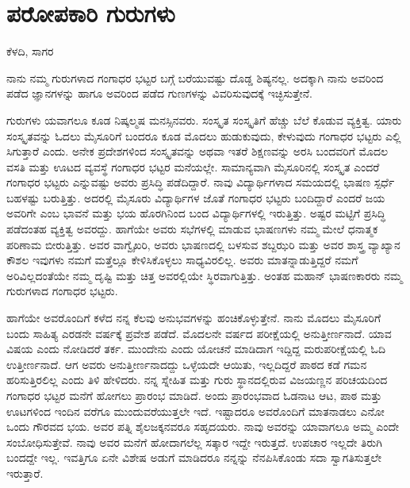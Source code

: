 {\fontsize{14}{16}\selectfont
\chapter{ಪರೋಪಕಾರಿ ಗುರುಗಳು}

\begin{center}
\smallskip
ಕೆಳದಿ, ಸಾಗರ \\
\addrule
\end{center}
ನಾನು ನಮ್ಮ ಗುರುಗಳಾದ ಗಂಗಾಧರ ಭಟ್ಟರ ಬಗ್ಗೆ ಬರೆಯುವಷ್ಟು ದೊಡ್ಡ ಶಿಷ್ಯನಲ್ಲ. ಅದಕ್ಕಾಗಿ ನಾನು ಅವರಿಂದ ಪಡೆದ ಜ್ಞಾನಗಳನ್ನು ಹಾಗೂ ಅವರಿಂದ ಪಡೆದ ಗುಣಗಳನ್ನು ವಿವರಿಸುವುದಕ್ಕೆ ಇಚ್ಛಿಸುತ್ತೇನೆ.

ಗುರುಗಳು ಯವಾಗಲೂ ಕೂಡ ನಿಷ್ಕಲ್ಮಷ ಮನಸ್ಸಿನವರು. ಸಂಸ್ಕೃತ ಸಂಸ್ಕೃತಿಗೆ ಹೆಚ್ಚು ಬೆಲೆ ಕೊಡುವ ವ್ಯಕ್ತಿತ್ವ. ಯಾರು ಸಂಸ್ಕೃತವನ್ನು ಓದಲು ಮೈಸೂರಿಗೆ ಬಂದರೂ ಕೂಡ ಮೊದಲು ಹುಡುಕುವುದು, ಕೇಳುವುದು ಗಂಗಾಧರ ಭಟ್ಟರು ಎಲ್ಲಿ ಸಿಗುತ್ತಾರೆ ಎಂದು. ಅನೇಕ ಪ್ರದೇಶಗಳಿಂದ ಸಂಸ್ಕೃತವನ್ನು ಅಥವಾ ಇತರೆ ಶಿಕ್ಷಣವನ್ನು ಅರಸಿ ಬಂದವರಿಗೆ ಮೊದಲ ವಸತಿ ಮತ್ತು ಊಟದ ವ್ಯವಸ್ಥೆ ಗಂಗಾಧರ ಭಟ್ಟರ ಮನೆಯಲ್ಲೇ. ಸಾಮಾನ್ಯವಾಗಿ ಮೈಸೂರಿನಲ್ಲಿ ಸಂಸ್ಕೃತ ಎಂದರೆ ಗಂಗಾಧರ ಭಟ್ಟರು ಎನ್ನುವಷ್ಟು ಅವರು ಪ್ರಸಿದ್ಧಿ ಪಡೆದಿದ್ದಾರೆ. ನಾವು ವಿದ್ಯಾರ್ಥಿಗಳಾದ ಸಮಯದಲ್ಲಿ ಭಾಷಣ ಸ್ಪರ್ಧೆ ಬಹಳಷ್ಟು ಬರುತ್ತಿತ್ತು. ಅದರಲ್ಲಿ ಮೈಸೂರು ವಿದ್ಯಾರ್ಥಿಗಳ ಜೊತೆ ಗಂಗಾಧರ ಭಟ್ಟರು ಬಂದಿದ್ದಾರೆ ಎಂದರೆ ಜಯ ಅವರಿಗೇ ಎಂಬ ಭಾವನೆ ಮತ್ತು ಭಯ ಹೊರಗಿನಿಂದ ಬಂದ ವಿದ್ಯಾರ್ಥಿಗಳಲ್ಲಿ ಇರುತ್ತಿತ್ತು. ಅಷ್ಟರ ಮಟ್ಟಿಗೆ ಪ್ರಸಿದ್ಧಿ ಪಡೆದಂತಹ ವ್ಯಕ್ತಿತ್ವ ಅವರದ್ದು. ಹಾಗೆಯೇ ಅವರು ಸಭೆಗಳಲ್ಲಿ ಮಾಡುವ ಭಾಷಣಗಳು ನಮ್ಮ ಮೇಲೆ ಧನಾತ್ಮಕ ಪರಿಣಾಮ ಬೀರುತ್ತಿತ್ತು. ಅವರ ವಾಗ್ವೈಖರಿ, ಅವರು ಭಾಷಣದಲ್ಲಿ ಬಳಸುವ ಶಬ್ದಝರಿ ಮತ್ತು ಅವರ ಶಾಸ್ತ್ರ ವ್ಯಾಖ್ಯಾನ ಕೌಶಲ  \enginline{-}   ಇವುಗಳು ನಮಗೆ ಮತ್ತೆಲ್ಲೂ ಕೇಳಿಸಿಕೊಳ್ಳಲು ಸಾಧ್ಯವಿರಲಿಲ್ಲ. ಅವರು ಮಾತನ್ನಾಡುತ್ತಿದ್ದರೆ ನಮಗೆ ಅರಿವಿಲ್ಲದಂತೆಯೇ ನಮ್ಮ ದೃಷ್ಟಿ ಮತ್ತು ಚಿತ್ತ ಅವರಲ್ಲಿಯೇ ಸ್ಥಿರವಾಗುತ್ತಿತ್ತು. ಅಂತಹ ಮಹಾನ್ ಭಾಷಣಕಾರರು ನಮ್ಮ ಗುರುಗಳಾದ ಗಂಗಾಧರ ಭಟ್ಟರು.
	
ಹಾಗೆಯೇ ಅವರೊಂದಿಗೆ ಕಳೆದ ನನ್ನ ಕೆಲವು ಅನುಭವಗಳನ್ನು ಹಂಚಿಕೊಳ್ಳುತ್ತೇನೆ. ನಾನು ಮೊದಲು ಮೈಸೂರಿಗೆ ಬಂದು ಸಾಹಿತ್ಯ ಎರಡನೇ ವರ್ಷಕ್ಕೆ ಪ್ರವೇಶ ಪಡೆದೆ. ಮೊದಲನೇ ವರ್ಷದ ಪರೀಕ್ಷೆಯಲ್ಲಿ ಅನುತ್ತೀರ್ಣನಾದೆ. ಯಾವ ವಿಷಯ ಎಂದು ನೋಡಿದರೆ ತರ್ಕ. ಮುಂದೇನು ಎಂದು ಯೋಚನೆ ಮಾಡಿದಾಗ ಇದ್ದಿದ್ದ ಮರು\-ಪರೀಕ್ಷೆಯಲ್ಲಿ ಓದಿ ಉತ್ತೀರ್ಣನಾದೆ. ಆಗ ಅವರು ಅನುತ್ತೀರ್ಣನಾದದ್ದು ಒಳ್ಳೆಯದೇ ಆಯಿತು, ಇಲ್ಲದಿದ್ದರೆ ಪಾಠದ ಕಡೆ ಗಮನ ಹರಿಸುತ್ತಿರಲಿಲ್ಲ ಎಂದು ತಿಳಿ ಹೇಳಿದರು. ನನ್ನ ಸ್ನೇಹಿತ ಮತ್ತು ಗುರು ಸ್ಥಾನದಲ್ಲಿರುವ ವಿಜಯಣ್ಣನ ಪರಿಚಯದಿಂದ ಗಂಗಾಧರ ಭಟ್ಟರ ಮನೆಗೆ ಹೋಗಲು ಪ್ರಾರಂಭ ಮಾಡಿದೆ. ಅಂದು ಪ್ರಾರಂಭವಾದ ಓಡನಾಟ ಆಟ, ಪಾಠ ಮತ್ತು ಊಟಗಳಿಂದ ಇಂದಿನ ವರೆಗೂ ಮುಂದುವರೆಯುತ್ತಲೇ ಇದೆ. ಇಷ್ಟಾದರೂ ಅವರೊಂದಿಗೆ ಮಾತನಾಡಲು ಎನೋ ಒಂದು ಗೌರವದ ಭಯ. ಅವರ ಪತ್ನಿ ಶೈಲಜಕ್ಕನವರೂ ಸಹೃದಯರು. ನಾವು ಅವರನ್ನು ಯಾವಾಗಲೂ ಅಮ್ಮ ಎಂದೇ ಸಂಬೋಧಿ\-ಸುತ್ತೇವೆ. ನಾವು ಅವರ ಮನೆಗೆ ಹೋದಾಗಲೆಲ್ಲ ಸತ್ಕಾರ ಇದ್ದೇ ಇರುತ್ತದೆ. ಉಪಚಾರ ಇಲ್ಲದೇ ತಿರುಗಿ ಬಂದದ್ದೇ ಇಲ್ಲ. ಇವತ್ತಿಗೂ ಏನೇ ವಿಶೇಷ ಅಡುಗೆ ಮಾಡಿದರೂ ನನ್ನನ್ನು ನೆನಪಿಸಿಕೊಂಡು ಸದಾ ಸ್ವಾಗತಿಸುತ್ತಲೇ ಇರುತ್ತಾರೆ.
	
}
